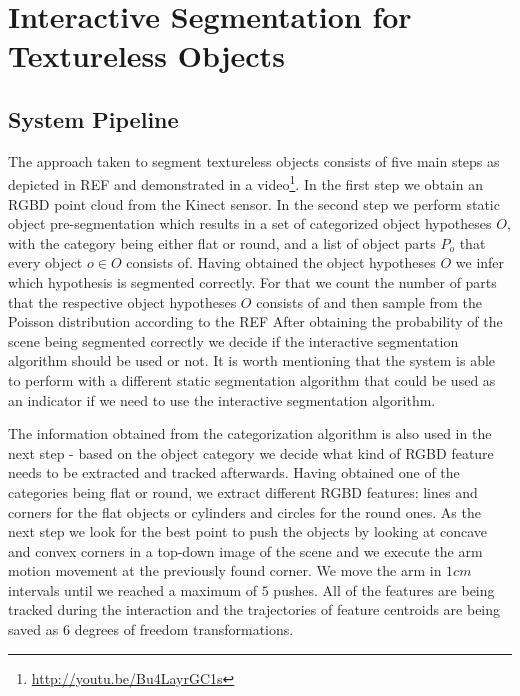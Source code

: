 \chapter{Interactive Segmentation for Textureless Objects}
\label{chapter:Textureless Segmentation}


\section{System Pipeline}
 The approach taken to segment textureless objects   
 consists of five main steps as depicted in REF%
  and demonstrated in a video\footnote{\url{http://youtu.be/Bu4LayrGC1s}}.
 In the first step we obtain an RGBD point cloud from the Kinect sensor. In the second step we perform static object
 pre-segmentation which results in a set of categorized object hypotheses $O$,
 with the category being either flat or round, and a list of object parts $P_{o}$ that every object 
 $o \in O$ consists of. Having obtained the object hypotheses $O$ we infer which hypothesis
 is segmented  correctly. For
 that we count the  number of parts that the respective object hypotheses $O$ 
 consists of and then sample from the Poisson distribution according to the REF%
 After obtaining the probability of the scene being segmented correctly we 
decide if the interactive segmentation algorithm should be used or not. It is worth mentioning that the system is able to perform with a different static segmentation algorithm that could be used as an indicator if we need to use the interactive segmentation algorithm.

 The information obtained from the categorization algorithm is also used in the next step - based on the object category we decide what kind of RGBD feature needs to be extracted and tracked afterwards. Having obtained one of the categories being flat or round, we extract different RGBD features: lines and corners for the flat objects or cylinders and circles for the round ones. As the next step we look for the best point to push the objects by looking at concave and convex corners in a top-down image of the scene and we execute the arm motion movement at the previously found corner. We move the arm in $1cm$ intervals until we reached a maximum of $5$ 
  pushes. All of the features are being tracked during the interaction 
 and the trajectories of feature centroids  are being  saved as 6 degrees of freedom transformations. 
 
